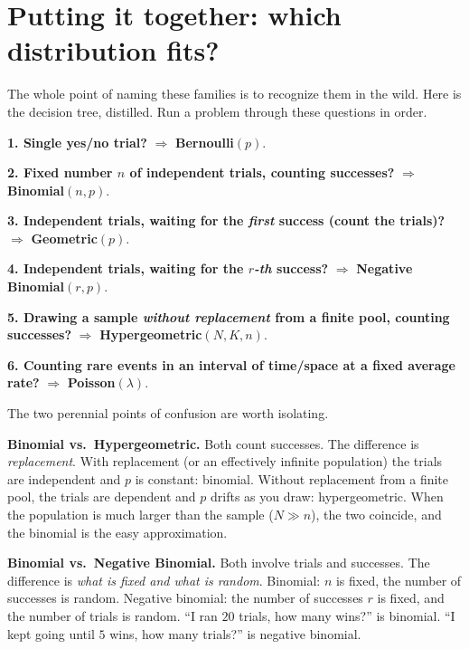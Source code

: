 \section{Putting it together: which distribution fits?}
\label{ch07:decision}

The whole point of naming these families is to recognize them in the wild. Here is
the decision tree, distilled. Run a problem through these questions in order.

\begin{focusbox}
\textbf{1. Single yes/no trial?} $\Rightarrow$ \textbf{Bernoulli}$(p)$.

\textbf{2. Fixed number $n$ of independent trials, counting successes?}
$\Rightarrow$ \textbf{Binomial}$(n, p)$.

\textbf{3. Independent trials, waiting for the \emph{first} success (count the
trials)?} $\Rightarrow$ \textbf{Geometric}$(p)$.

\textbf{4. Independent trials, waiting for the \emph{$r$-th} success?}
$\Rightarrow$ \textbf{Negative Binomial}$(r, p)$.

\textbf{5. Drawing a sample \emph{without replacement} from a finite pool,
counting successes?} $\Rightarrow$ \textbf{Hypergeometric}$(N, K, n)$.

\textbf{6. Counting rare events in an interval of time/space at a fixed average
rate?} $\Rightarrow$ \textbf{Poisson}$(\lambda)$.
\end{focusbox}

The two perennial points of confusion are worth isolating.

\begin{trapbox}
\textbf{Binomial vs.\ Hypergeometric.} Both count successes. The difference is
\emph{replacement}. With replacement (or an effectively infinite population) the
trials are independent and $p$ is constant: binomial. Without replacement from a
finite pool, the trials are dependent and $p$ drifts as you draw: hypergeometric.
When the population is much larger than the sample ($N \gg n$), the two coincide,
and the binomial is the easy approximation.

\textbf{Binomial vs.\ Negative Binomial.} Both involve trials and successes. The
difference is \emph{what is fixed and what is random}. Binomial: $n$ is fixed, the
number of successes is random. Negative binomial: the number of successes $r$ is
fixed, and the number of trials is random. ``I ran $20$ trials, how many wins?'' is
binomial. ``I kept going until $5$ wins, how many trials?'' is negative binomial.
\end{trapbox}

